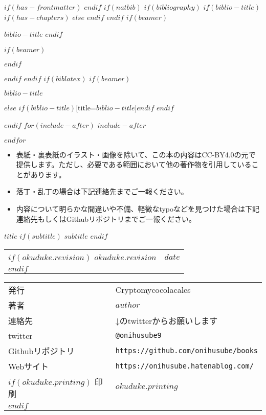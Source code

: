 $if(has-frontmatter)$
\backmatter
$endif$
$if(natbib)$
$if(bibliography)$
$if(biblio-title)$
$if(has-chapters)$
\renewcommand\bibname{$biblio-title$}
$else$
\renewcommand\refname{$biblio-title$}
$endif$
$endif$
$if(beamer)$
\begin{frame}[allowframebreaks]{$biblio-title$}
  \bibliographytrue
$endif$
  
$if(beamer)$
\end{frame}
$endif$

$endif$
$endif$
$if(biblatex)$
$if(beamer)$
\begin{frame}[allowframebreaks]{$biblio-title$}
  \bibliographytrue
  \printbibliography[heading=none]
\end{frame}
$else$
\printbibliography$if(biblio-title)$[title=$biblio-title$]$endif$
$endif$

$endif$
$for(include-after)$
$include-after$

$endfor$


\clearpage

\pagestyle{empty}

\begin{itemize}
  \item 表紙・裏表紙のイラスト・画像を除いて、この本の内容はCC-BY4.0の元で提供します。ただし、必要である範囲において他の著作物を引用していることがあります。
  \item 落丁・乱丁の場合は下記連絡先までご一報ください。
  \item 内容について明らかな間違いや不備、軽微なtypoなどを見つけた場合は下記連絡先もしくはGithubリポジトリまでご一報ください。
\end{itemize}


\begin{center}
\textsf{$title$}
$if(subtitle)$
$subtitle$
$endif$

\begin{tabular}{ll}
$if(okuduke.revision)$
$okuduke.revision$ & $date$ \\
$endif$
\end{tabular}

\begin{tabular}{ll} \toprule
  発行      & Cryptomycocolacales \\
  著者      & $author$ \\
  連絡先    & ↓のtwitterからお願いします \\
  twitter  & \verb|@onihusube9| \\
  Githubリポジトリ  & \verb|https://github.com/onihusube/books| \\
  Webサイト & \verb|https://onihusube.hatenablog.com/| \\
  $if(okuduke.printing)$
  印刷      & $okuduke.printing$  \\
  $endif$
\end{tabular}
\end{center}

